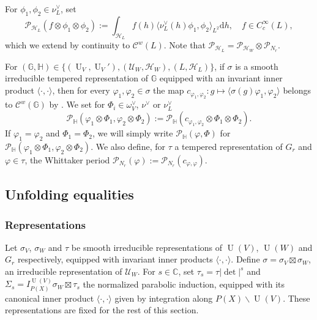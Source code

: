 \documentclass[letterpaper,11pt]{amsart}
\newcommand{\C}{\mathbb{C}}
\newcommand{\cC}{\mathcal{C}}
\newcommand{\cH}{\mathcal{H}}
\newcommand{\cP}{\mathcal{P}}
\newcommand{\cU}{\mathcal{U}}
\newcommand{\rd}{\mathrm{d}}
\newcommand{\<}{\negthickspace}
\newcommand{\valP}[1]{\left|#1\right|}
\DeclareMathOperator{\U}{U}
\theoremstyle{definition}
\theoremstyle{plain}
\theoremstyle{remark}
\numberwithin{equation}{section}
\begin{document}
For $\phi_1, \phi_2 \in \nu^\vee_L$, set
\begin{equation*}
    \mathcal{P}_{\cH_L}(f \otimes \phi_1 \otimes \phi_2) := \int_{\cH_L} f(h) \langle\nu^\vee_L(h) \phi_1, \phi_2\rangle_{L^2} \rd h, \quad f \in C_c^{\infty}(L),
\end{equation*}
which we extend by continuity to $\cC^w(L)$. Note that $\mathcal{P}_{\cH_L}=\mathcal{P}_{\cH_W} \otimes \mathcal{P}_{N_r}$.

For $(\mathbb{G},\mathbb{H}) \in \{ (\U_V, \U_V'), (\cU_W,\cH_W),(L,\cH_L) \}$, if $\sigma$ is a smooth irreducible tempered representation of $\mathbb{G}$ equipped with an invariant inner product $\langle\cdot,\cdot\rangle$, then for every $\varphi_1, \varphi_2 \in \sigma$ the map $c_{\varphi_1,\varphi_2} : g \mapsto \langle \sigma(g) \varphi_1, \varphi_2\rangle$ belongs to $\mathcal{C}^w(\mathbb{G})$ by \cite{CHH88}. We set for $\Phi_i \in \omega^\vee_V$, $\nu^\vee$ or $\nu^\vee_L$
\begin{equation}
\label{eq:integral_of_coefficients}
    \mathcal{P}_{\mathbb{H}}(\varphi_1 \otimes \Phi_1, \varphi_2 \otimes \Phi_2):= \mathcal{P}_{\mathbb{H}}(c_{\varphi_1,\varphi_2} \otimes \Phi_1 \otimes \Phi_2).
\end{equation}
If $\varphi_1=\varphi_2$ and $\Phi_1=\Phi_2$, we will simply write $\mathcal{P}_{\mathbb{H}}(\varphi, \Phi)$ for $\mathcal{P}_{\mathbb{H}}(\varphi_1 \otimes \Phi_1, \varphi_2 \otimes \Phi_2)$. We also define, for $\tau$ a tempered representation of $G_r$ and $\varphi \in \tau$, the Whittaker period $\cP_{N_r}(\varphi):=\cP_{N_r}(c_{\varphi,\varphi})$.

\subsection{Unfolding equalities}
\label{sec:unfold_eq}

\subsubsection{Representations}
\label{subsubsec:reps}
Let $\sigma_V$, $\sigma_W$ and $\tau$ be smooth irreducible representations of $\U(V)$, $\U(W)$ and $G_r$ respectively, equipped with invariant inner products $\langle \cdot, \cdot \rangle$. Define $\sigma=\sigma_V \boxtimes \sigma_W$, an irreducible representation of $\cU_W$. For $s \in \C$, set $\tau_s=\tau \valP{\det}^s$ and $\Sigma_s=I_{P(X)}^{\U(V)} \sigma_W \boxtimes \tau_s$ the normalized parabolic induction, equipped with its canonical inner product $\langle \cdot, \cdot \rangle$ given by integration along $P(X) \backslash \U(V)$. These representations are fixed for the rest of this section. 
\end{document}
